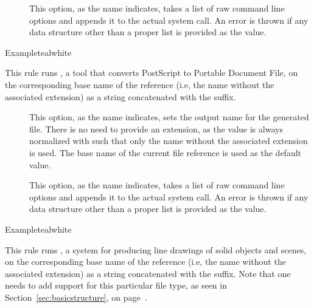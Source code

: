 \begin{description}
\begin{description}
\item[] This option, as the name indicates, takes a list of raw command line options and appends it to the actual system call. An error is thrown if any data structure other than a proper list is provided as the value.
\end{description}

\begin{codebox}{Example}{teal}{\icnote}{white}
\end{codebox}

\item[\rulebox{ps2pdf}]
This rule runs , a tool that converts PostScript to Portable Document File, on the corresponding base name of the  reference (i.e, the name without the associated extension) as a string concatenated with the  suffix.

\begin{description}
\item[] This option, as the name indicates, sets the output name for the generated  file. There is no need to provide an extension, as the value is always normalized with  such that only the name without the associated extension is used. The base name of the current file reference is used as the default value.

\item[] This option, as the name indicates, takes a list of raw command line options and appends it to the actual system call. An error is thrown if any data structure other than a proper list is provided as the value.
\end{description}

\begin{codebox}{Example}{teal}{\icnote}{white}
\end{codebox}

\item[\rulebox{sketch}]
This rule runs , a system for producing line drawings of solid objects and scenes, on the corresponding base name of the  reference (i.e, the name without the associated extension) as a string concatenated with the  suffix. Note that one needs to add support for this particular file type, as seen in Section~\ref{sec:basicstructure}, on page~\pageref{sec:basicstructure}.


\end{description}
